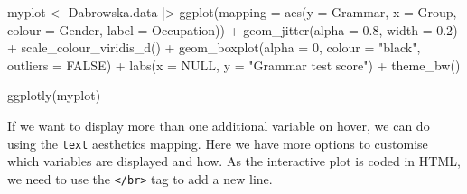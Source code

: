 \documentclass[
  letterpaper,
  DIV=11,
  numbers=noendperiod]{scrreprt}
\newenvironment{Shaded}{\begin{snugshade}}{\end{snugshade}}
\newcommand{\AttributeTok}[1]{\textcolor[rgb]{0.40,0.45,0.13}{#1}}
\newcommand{\ConstantTok}[1]{\textcolor[rgb]{0.56,0.35,0.01}{#1}}
\newcommand{\DecValTok}[1]{\textcolor[rgb]{0.68,0.00,0.00}{#1}}
\newcommand{\FloatTok}[1]{\textcolor[rgb]{0.68,0.00,0.00}{#1}}
\newcommand{\FunctionTok}[1]{\textcolor[rgb]{0.28,0.35,0.67}{#1}}
\newcommand{\NormalTok}[1]{\textcolor[rgb]{0.00,0.23,0.31}{#1}}
\newcommand{\OtherTok}[1]{\textcolor[rgb]{0.00,0.23,0.31}{#1}}
\newcommand{\SpecialCharTok}[1]{\textcolor[rgb]{0.37,0.37,0.37}{#1}}
\newcommand{\StringTok}[1]{\textcolor[rgb]{0.13,0.47,0.30}{#1}}
\begin{document}
\begin{Shaded}
\begin{Highlighting}[]
\NormalTok{myplot }\OtherTok{\textless{}{-}}\NormalTok{ Dabrowska.data }\SpecialCharTok{|\textgreater{}} 
  \FunctionTok{ggplot}\NormalTok{(}\AttributeTok{mapping =} \FunctionTok{aes}\NormalTok{(}\AttributeTok{y =}\NormalTok{ Grammar, }
                       \AttributeTok{x =}\NormalTok{ Group, }
                       \AttributeTok{colour =}\NormalTok{ Gender,}
                       \AttributeTok{label =}\NormalTok{ Occupation)) }\SpecialCharTok{+}
  \FunctionTok{geom\_jitter}\NormalTok{(}\AttributeTok{alpha =} \FloatTok{0.8}\NormalTok{, }
              \AttributeTok{width =} \FloatTok{0.2}\NormalTok{) }\SpecialCharTok{+}
  \FunctionTok{scale\_colour\_viridis\_d}\NormalTok{() }\SpecialCharTok{+}
  \FunctionTok{geom\_boxplot}\NormalTok{(}\AttributeTok{alpha =} \DecValTok{0}\NormalTok{, }
               \AttributeTok{colour =} \StringTok{"black"}\NormalTok{,}
               \AttributeTok{outliers =} \ConstantTok{FALSE}\NormalTok{) }\SpecialCharTok{+}
  \FunctionTok{labs}\NormalTok{(}\AttributeTok{x =} \ConstantTok{NULL}\NormalTok{,}
       \AttributeTok{y =} \StringTok{"Grammar test score"}\NormalTok{) }\SpecialCharTok{+}
  \FunctionTok{theme\_bw}\NormalTok{()}

\FunctionTok{ggplotly}\NormalTok{(myplot)}
\end{Highlighting}
\end{Shaded}

If we want to display more than one additional variable on hover, we can
do using the \texttt{text} aesthetics mapping. Here we have more options
to customise which variables are displayed and how. As the interactive
plot is coded in HTML, we need to use the
\texttt{\textless{}/br\textgreater{}} tag to add a new line.
\end{document}
